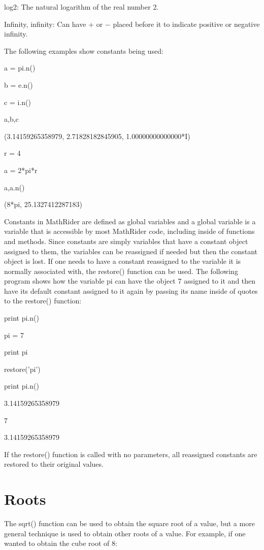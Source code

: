 \documentclass[12pt,oneside]{book}
\begin{document}
log2: The natural logarithm of the real number 2.


Infinity, infinity: Can have + or $-$ placed before it to indicate positive or negative infinity. 

The following examples show constants being used:


a = pi.n()

b = e.n()

c = i.n()

a,b,c

{\textbar}

(3.14159265358979, 2.71828182845905, 1.00000000000000*I)


r = 4

a = 2*pi*r

a,a.n()

{\textbar}

(8*pi, 25.1327412287183)

Constants in MathRider are defined as global variables and a global variable is a variable that is accessible by most MathRider code, including inside of functions and methods. Since constants are simply variables that have a constant object assigned to them, the variables can be reassigned if needed but then the constant object is lost. If one needs to have a constant reassigned to the variable it is normally associated with, the restore() function can be used. The following program shows how the variable pi can have the object 7 assigned to it and then have its default constant assigned to it again by passing its name inside of quotes to the restore() function: 

print pi.n()


pi = 7

print pi


restore('pi')

print pi.n()

{\textbar}

3.14159265358979

7

3.14159265358979

If the restore() function is called with no parameters, all reassigned constants are restored to their original values.

\section[Roots]{Roots}

The sqrt() function can be used to obtain the square root of a value, but a more general technique is used to obtain other roots of a value. For example, if one wanted to obtain the cube root of 8: 
\end{document}
